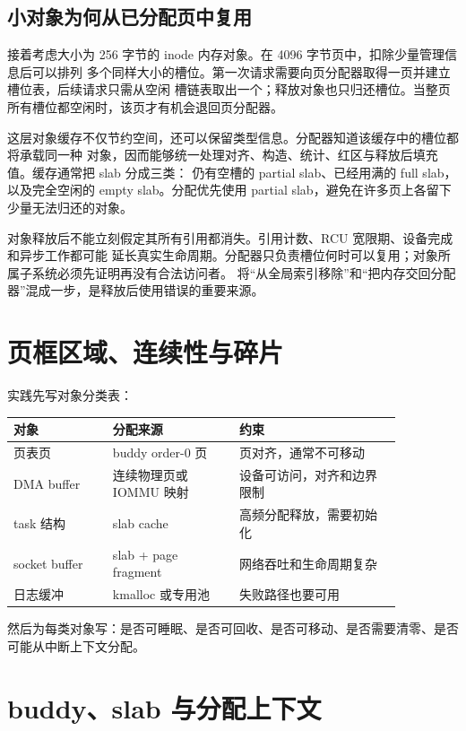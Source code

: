 \subsection{小对象为何从已分配页中复用}

接着考虑大小为 256 字节的 inode 内存对象。在 4096 字节页中，扣除少量管理信息后可以排列
多个同样大小的槽位。第一次请求需要向页分配器取得一页并建立槽位表，后续请求只需从空闲
槽链表取出一个；释放对象也只归还槽位。当整页所有槽位都空闲时，该页才有机会退回页分配器。

这层对象缓存不仅节约空间，还可以保留类型信息。分配器知道该缓存中的槽位都将承载同一种
对象，因而能够统一处理对齐、构造、统计、红区与释放后填充值。缓存通常把 slab 分成三类：
仍有空槽的 partial slab、已经用满的 full slab，以及完全空闲的 empty slab。分配优先使用
partial slab，避免在许多页上各留下少量无法归还的对象。

对象释放后不能立刻假定其所有引用都消失。引用计数、RCU 宽限期、设备完成和异步工作都可能
延长真实生命周期。分配器只负责槽位何时可以复用；对象所属子系统必须先证明再没有合法访问者。
将“从全局索引移除”和“把内存交回分配器”混成一步，是释放后使用错误的重要来源。

\section{页框区域、连续性与碎片}

实践先写对象分类表：

\begin{longtable}{|p{0.22\linewidth}|p{0.28\linewidth}|p{0.36\linewidth}|}
\toprule
对象 & 分配来源 & 约束 \\
\midrule
页表页 & buddy order-0 页 & 页对齐，通常不可移动 \\\tablerowrule
DMA buffer & 连续物理页或 IOMMU 映射 & 设备可访问，对齐和边界限制 \\\tablerowrule
task 结构 & slab cache & 高频分配释放，需要初始化 \\\tablerowrule
socket buffer & slab + page fragment & 网络吞吐和生命周期复杂 \\\tablerowrule
日志缓冲 & kmalloc 或专用池 & 失败路径也要可用 \\
\bottomrule
\end{longtable}

然后为每类对象写：是否可睡眠、是否可回收、是否可移动、是否需要清零、是否可能从中断上下文分配。

\section{buddy、slab 与分配上下文}


